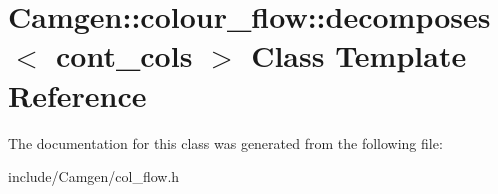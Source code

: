 \hypertarget{a00124}{}\section{Camgen\+:\+:colour\+\_\+flow\+:\+:decomposes$<$ cont\+\_\+cols $>$ Class Template Reference}
\label{a00124}


The documentation for this class was generated from the following file\+:\begin{DoxyCompactItemize}
\item 
include/\+Camgen/col\+\_\+flow.\+h\end{DoxyCompactItemize}
